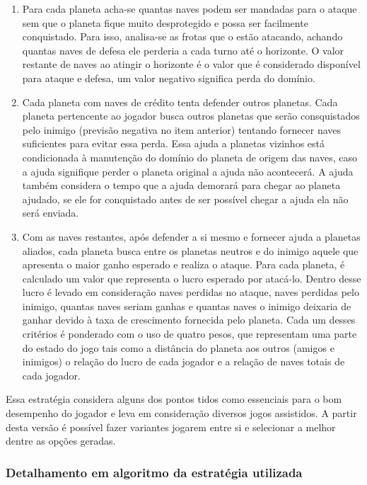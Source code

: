 \documentclass[a4paper,titlepage,11pt]{article}
\begin{document}
\begin{enumerate}
	\item Para cada planeta acha-se quantas naves podem ser mandadas para o ataque sem que o planeta fique muito 		desprotegido e possa ser facilmente conquistado. 
Para isso, analisa-se as frotas que o estão atacando, achando quantas naves de defesa ele perderia a cada turno até o horizonte. O valor restante de naves ao atingir o horizonte é o valor que é considerado disponível para ataque e defesa, um valor negativo significa perda do domínio.
	\item Cada planeta com naves de crédito tenta defender outros planetas.
Cada planeta pertencente ao jogador busca outros planetas que serão consquistados pelo inimigo (previsão negativa no item anterior) tentando fornecer naves suficientes para evitar essa perda. Essa ajuda a planetas vizinhos está condicionada à manutenção do domínio do planeta de origem das naves, caso a ajuda signifique perder o planeta original a ajuda não acontecerá. A ajuda também considera o tempo que a ajuda demorará para chegar ao planeta ajudado, se ele for conquistado antes de ser possível chegar a ajuda ela não será enviada.
	\item Com as naves restantes, após defender a si mesmo e fornecer ajuda a planetas aliados, cada planeta busca entre os planetas neutros e do inimigo aquele que apresenta o maior ganho esperado e realiza o ataque.
Para cada planeta, é calculado um valor que representa o lucro esperado por atacá-lo. Dentro desse lucro é levado em consideração naves perdidas no ataque, naves perdidas pelo inimigo, quantas naves seriam ganhas e quantas naves o inimigo deixaria de ganhar devido à taxa de crescimento fornecida pelo planeta. Cada um desses critérios é ponderado com o uso de quatro pesos, que representam uma parte do estado do jogo tais como a distância do planeta aos outros (amigos e inimigos) o relação do lucro de cada jogador e a relação de naves totais de cada jogador.
\end{enumerate}

Essa estratégia considera alguns dos pontos tidos como essenciais para o bom desempenho do jogador e leva em consideração diversos jogos assistidos. A partir desta versão é possível fazer variantes jogarem entre si e selecionar a melhor dentre as opções geradas.

\subsubsection{Detalhamento em algoritmo da estratégia utilizada}
\end{document}

